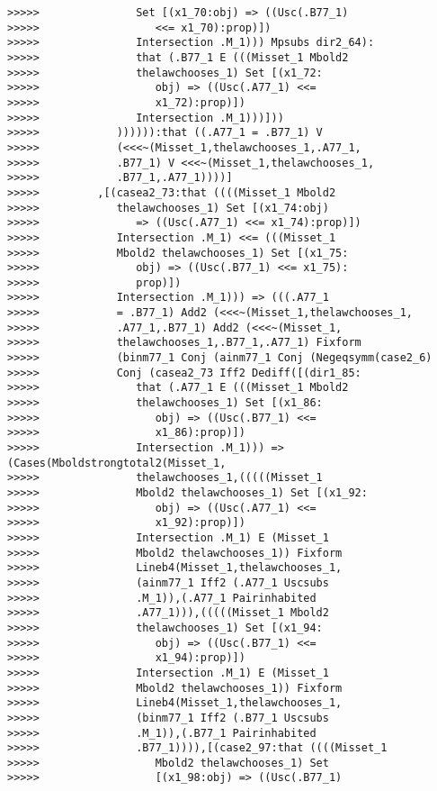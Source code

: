 \documentclass[12pt]{article}
\begin{document}
\begin{verbatim}
>>>>>               Set [(x1_70:obj) => ((Usc(.B77_1)
>>>>>                  <<= x1_70):prop)])
>>>>>               Intersection .M_1))) Mpsubs dir2_64):
>>>>>               that (.B77_1 E (((Misset_1 Mbold2
>>>>>               thelawchooses_1) Set [(x1_72:
>>>>>                  obj) => ((Usc(.A77_1) <<=
>>>>>                  x1_72):prop)])
>>>>>               Intersection .M_1)))]))
>>>>>            )))))):that ((.A77_1 = .B77_1) V
>>>>>            (<<<~(Misset_1,thelawchooses_1,.A77_1,
>>>>>            .B77_1) V <<<~(Misset_1,thelawchooses_1,
>>>>>            .B77_1,.A77_1))))]
>>>>>         ,[(casea2_73:that ((((Misset_1 Mbold2
>>>>>            thelawchooses_1) Set [(x1_74:obj)
>>>>>               => ((Usc(.A77_1) <<= x1_74):prop)])
>>>>>            Intersection .M_1) <<= (((Misset_1
>>>>>            Mbold2 thelawchooses_1) Set [(x1_75:
>>>>>               obj) => ((Usc(.B77_1) <<= x1_75):
>>>>>               prop)])
>>>>>            Intersection .M_1))) => (((.A77_1
>>>>>            = .B77_1) Add2 (<<<~(Misset_1,thelawchooses_1,
>>>>>            .A77_1,.B77_1) Add2 (<<<~(Misset_1,
>>>>>            thelawchooses_1,.B77_1,.A77_1) Fixform
>>>>>            (binm77_1 Conj (ainm77_1 Conj (Negeqsymm(case2_6)
>>>>>            Conj (casea2_73 Iff2 Dediff([(dir1_85:
>>>>>               that (.A77_1 E (((Misset_1 Mbold2
>>>>>               thelawchooses_1) Set [(x1_86:
>>>>>                  obj) => ((Usc(.B77_1) <<=
>>>>>                  x1_86):prop)])
>>>>>               Intersection .M_1))) => (Cases(Mboldstrongtotal2(Misset_1,
>>>>>               thelawchooses_1,(((((Misset_1
>>>>>               Mbold2 thelawchooses_1) Set [(x1_92:
>>>>>                  obj) => ((Usc(.A77_1) <<=
>>>>>                  x1_92):prop)])
>>>>>               Intersection .M_1) E (Misset_1
>>>>>               Mbold2 thelawchooses_1)) Fixform
>>>>>               Lineb4(Misset_1,thelawchooses_1,
>>>>>               (ainm77_1 Iff2 (.A77_1 Uscsubs
>>>>>               .M_1)),(.A77_1 Pairinhabited
>>>>>               .A77_1))),(((((Misset_1 Mbold2
>>>>>               thelawchooses_1) Set [(x1_94:
>>>>>                  obj) => ((Usc(.B77_1) <<=
>>>>>                  x1_94):prop)])
>>>>>               Intersection .M_1) E (Misset_1
>>>>>               Mbold2 thelawchooses_1)) Fixform
>>>>>               Lineb4(Misset_1,thelawchooses_1,
>>>>>               (binm77_1 Iff2 (.B77_1 Uscsubs
>>>>>               .M_1)),(.B77_1 Pairinhabited
>>>>>               .B77_1)))),[(case2_97:that ((((Misset_1
>>>>>                  Mbold2 thelawchooses_1) Set
>>>>>                  [(x1_98:obj) => ((Usc(.B77_1)

\end{verbatim}
\end{document}
